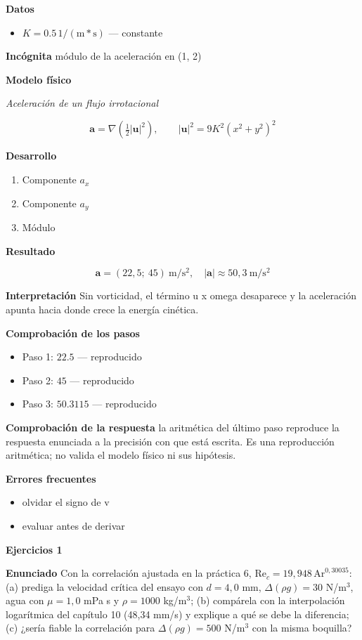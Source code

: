 \documentclass[10pt,openany]{book}
\begin{document}
\noindent\textbf{Datos}
\begin{itemize}
\item $K = 0.5\,\mathrm{1/(m*s)}$ — constante
\end{itemize}

\noindent\textbf{Incógnita}
módulo de la aceleración en (1, 2)

\noindent\textbf{Modelo físico}

\noindent\textit{Aceleración de un flujo irrotacional}

\[
\mathbf{a} = \nabla\!\left(\tfrac12|\mathbf{u}|^{2}\right),\qquad |\mathbf{u}|^{2} = 9K^{2}(x^{2} + y^{2})^{2}
\]

\noindent\textbf{Desarrollo}
\begin{enumerate}
\item
Componente \(a_x\)
\item
Componente \(a_y\)
\item
Módulo
\end{enumerate}

\noindent\textbf{Resultado}

\[
\mathbf{a} = (22{,}5;\ 45)\ \mathrm{m/s^{2}},\quad |\mathbf{a}| \approx 50{,}3\ \mathrm{m/s^{2}}
\]

\noindent\textbf{Interpretación}
Sin vorticidad, el término u x omega desaparece y la aceleración apunta hacia donde crece la energía cinética.

\noindent\textbf{Comprobación de los pasos}
\begin{itemize}
\item Paso 1: $22.5$ — reproducido
\item Paso 2: $45$ — reproducido
\item Paso 3: $50.3115$ — reproducido
\end{itemize}

\noindent\textbf{Comprobación de la respuesta} la aritmética del último paso reproduce la respuesta enunciada a la precisión con que está escrita. Es una reproducción aritmética; no valida el modelo físico ni sus hipótesis.

\noindent\textbf{Errores frecuentes}
\begin{itemize}
\item olvidar el signo de v
\item evaluar antes de derivar
\end{itemize}

\noindent\textbf{Ejercicios 1}

\noindent\textbf{Enunciado}
Con la correlación ajustada en la práctica 6, \(\mathrm{Re}_c = 19{,}948\,\mathrm{Ar}^{0{,}30035}\): (a) prediga la velocidad crítica del ensayo con \(d = 4{,}0\) mm, \(\Delta(\rho g) = 30\) N/m\(^3\), agua con \(\mu = 1{,}0\) mPa s y \(\rho = 1000\) kg/m\(^3\); (b) compárela con la interpolación logarítmica del capítulo 10 (48,34 mm/s) y explique a qué se debe la diferencia; (c) ¿sería fiable la correlación para \(\Delta(\rho g) = 500\) N/m\(^3\) con la misma boquilla?
\end{document}
